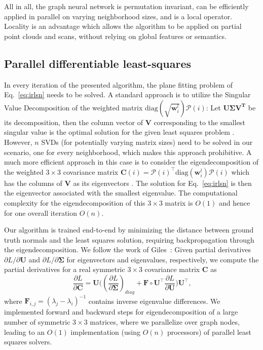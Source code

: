 \documentclass[10pt,twocolumn,letterpaper]{article}
\begin{document}
All in all, the graph neural network is permutation invariant, can be efficiently applied in parallel on varying neighborhood sizes, and is a local operator. Locality is an advantage which allows the algorithm to be applied on partial point clouds and scans, without relying on global features or semantics. 


\subsection{Parallel differentiable least-squares}
In every iteration of the presented algorithm, the plane fitting problem of Eq.~\ref{eq:irlsn} needs to be solved. A standard approach is to utilize the Singular Value Decomposition of the weighted matrix $\textrm{diag}(\sqrt{\mathbf{w}^{l}_i})\mathcal{P}(i)$: Let $\mathbf{U\Sigma V^T}$ be its decomposition, then the column vector of $\mathbf{V}$ corresponding to the smallest singular value is the optimal solution for the given least squares problem \cite{Hartley:2003, Ranftl:2018}. However, $n$ SVDs (for potentially varying matrix sizes) need to be solved in our scenario, one for every neighborhood, which makes this approach prohibitive. A much more efficient approach in this case is to consider the eigendecomposition of the weighted $3 \times 3$ covariance matrix $\mathbf{C}(i) = \mathcal{P}(i)^\top \textrm{diag}(\mathbf{w}^{l}_i) \mathcal{P}(i)$ which has the columns of $\mathbf{V}$ as its eigenvectors \cite{Hartley:2003}. The solution for Eq.~\ref{eq:irlsn} is then the eigenvector associated with the smallest eigenvalue. The computational complexity for the eigendecomposition of this $3 \times 3$ matrix is $O(1)$ and hence for one overall iteration $O(n)$.

Our algorithm is trained end-to-end by minimizing the distance between ground truth normals and the least squares solution, requiring backpropagation through the eigendecomposition. We follow the work of \mbox{Giles \cite{Giles:2008}}:  Given partial derivatives $\partial L/\partial \mathbf{U}$ and $\partial L/\partial \mathbf{\Sigma}$ for eigenvectors and eigenvalues, respectively, we compute the partial derivatives for a real symmetric $3\times 3$ covariance matrix $\mathbf{C}$ as
\begin{equation}
    \frac{\partial L}{\partial \mathbf{C}} = \mathbf{U} \big((\frac{\partial L}{\partial \mathbf{\Sigma}})_{diag} + \mathbf{F} \circ \mathbf{U}^\top  \frac{\partial L}{\partial \mathbf{U}}\big)\mathbf{U}^\top \textrm{,}
\end{equation}
where $\mathbf{F}_{i,j} = (\lambda_j - \lambda_i)^{-1}$ contains inverse eigenvalue differences.
We implemented forward and backward steps for eigendecomposition of a large number of symmetric $3\times 3$ matrices, where we parallelize over graph nodes, leading to an $O(1)$ implementation (using $O(n)$ processors) of parallel least squares solvers. 
\end{document}
